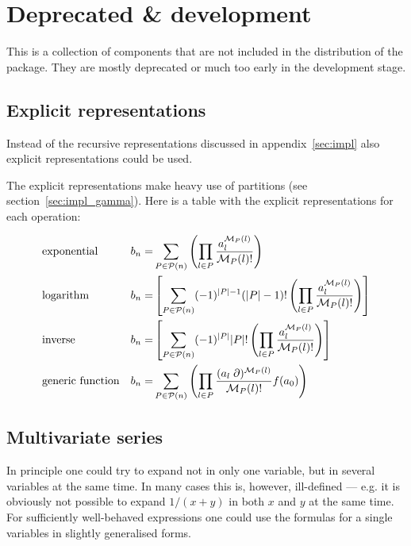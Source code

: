 \documentclass{article}
\begin{document}
\section{Deprecated \& development}
\label{sec:depr}

This is a collection of components that are not included in the
distribution of the package. They are mostly deprecated or much too
early in the development stage.

\subsection{Explicit representations}

Instead of the recursive representations discussed in
appendix~\ref{sec:impl} also explicit representations could be used.

The explicit representations make heavy use of partitions (see section~\ref{sec:impl_gamma}).
Here is a table with the explicit representations for each operation:


\begin{align}
  &\text{exponential} & b_n=& \sum_{P \in {\cal P}(n)} \left(\prod_{l \in P}
    \frac{a^{{\cal M}_P(l)}_l}{{\cal M}_P(l)!} \right)
  \notag\\
  &\text{logarithm} & b_n=&\left[\sum_{P \in {\cal P}(n)}
    (-1)^{|P|-1}(|P|-1)!\left(\prod_{l \in P} \frac{a^{{\cal
            M}_P(l)}_l}{{\cal M}_P(l)!} \right)\right]
  \notag\\
  &\text{inverse} & b_n=&\left[\sum_{P \in {\cal P}(n)}
    (-1)^{|P|}|P|!\left(\prod_{l \in P} \frac{a^{{\cal M}_P(l)}_l}{{\cal
          M}_P(l)!} \right)\right]
  \notag\\
  &\text{generic function}& b_n=& \sum_{P \in {\cal P}(n)} \left(\prod_{l \in P}
    \frac{(a_l \;\partial)^{{\cal M}_P(l)}}{{\cal M}_P(l)!}
    f(a_0)\right)
\label{eq:expl}
\end{align}

\subsection{Multivariate series}
\label{sec:multi_var}

In principle one could try to expand not in only one variable, but in
several variables at the same time. In many cases this is, however,
ill-defined --- e.g. it is obviously not possible to expand $1/(x+y)$ in
both $x$ and $y$ at the same time. For sufficiently well-behaved
expressions one could use the formulas for a single variables in slightly
generalised forms.
\end{document}
